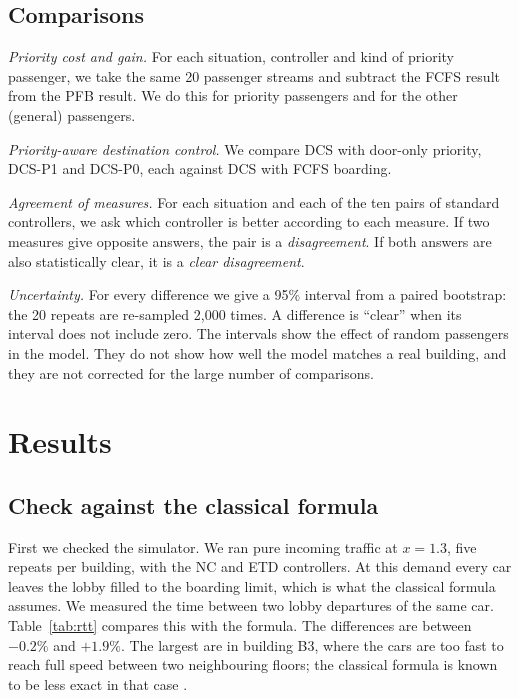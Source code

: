 \subsection{Comparisons}
\emph{Priority cost and gain.} For each situation, controller and kind of priority passenger, we take the same 20 passenger streams and subtract the FCFS result from the PFB result. We do this for priority passengers and for the other (general) passengers.

\emph{Priority-aware destination control.} We compare DCS with door-only priority, DCS-P1 and DCS-P0, each against DCS with FCFS boarding.

\emph{Agreement of measures.} For each situation and each of the ten pairs of standard controllers, we ask which controller is better according to each measure. If two measures give opposite answers, the pair is a \emph{disagreement}. If both answers are also statistically clear, it is a \emph{clear disagreement}.

\emph{Uncertainty.} For every difference we give a 95\% interval from a paired bootstrap: the 20 repeats are re-sampled 2,000 times. A difference is ``clear'' when its interval does not include zero. The intervals show the effect of random passengers in the model. They do not show how well the model matches a real building, and they are not corrected for the large number of comparisons.

\section{Results}\label{sec:results}

\subsection{Check against the classical formula}\label{sec:validation}
First we checked the simulator. We ran pure incoming traffic at $x=1.3$, five repeats per building, with the NC and ETD controllers. At this demand every car leaves the lobby filled to the boarding limit, which is what the classical formula assumes. We measured the time between two lobby departures of the same car. Table~\ref{tab:rtt} compares this with the formula. The differences are between $-0.2\%$ and $+1.9\%$. The largest are in building B3, where the cars are too fast to reach full speed between two neighbouring floors; the classical formula is known to be less exact in that case \cite{barney2016,alsharif2012}.

